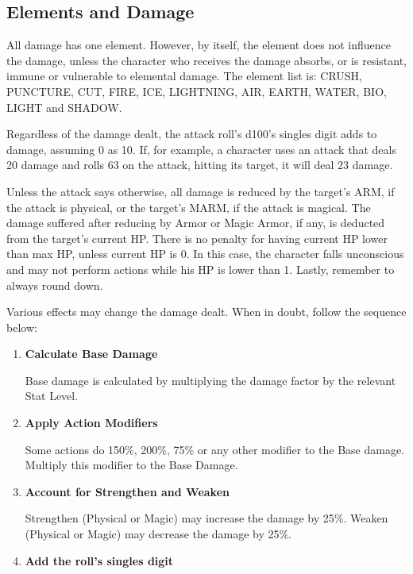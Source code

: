\begin{multicols}{2}
\begin{center}
\end{center}

\subsection{Elements and Damage}
All damage has one element. However, by itself, the element does not influence the damage, unless the character who receives the damage absorbs, or is resistant, immune or vulnerable to elemental damage. The element list is: CRUSH, PUNCTURE, CUT, FIRE, ICE, LIGHTNING, AIR, EARTH, WATER, BIO, LIGHT and SHADOW.

Regardless of the damage dealt, the attack roll’s d100’s singles digit adds to damage, assuming 0 as 10. If, for example, a character uses an attack that deals 20 damage and rolls 63 on the attack, hitting its target, it will deal 23 damage.

Unless the attack says otherwise, all damage is reduced by the target's ARM, if the attack is physical, or the target’s MARM, if the attack is magical. The damage suffered after reducing by Armor or Magic Armor, if any, is deducted from the target’s current HP. There is no penalty for having current HP lower than max HP, unless current HP is 0. In this case, the character falls unconscious and may not perform actions while his HP is lower than 1. Lastly, remember to always round down.

Various effects may change the damage dealt. When in doubt, follow the sequence below:
\begin{enumerate}
\item \textbf{Calculate Base Damage}

Base damage is calculated by multiplying the damage factor by the relevant Stat Level.

\item \textbf{Apply Action Modifiers}

Some actions do 150\%, 200\%, 75\% or any other modifier to the Base damage. Multiply this modifier to the Base Damage.

\item \textbf{Account for Strengthen and Weaken}

Strengthen (Physical or Magic) may increase the damage by 25\%. Weaken (Physical or Magic) may decrease the damage by 25\%.

\item \textbf{Add the roll's singles digit}


\end{enumerate}
\end{multicols}
